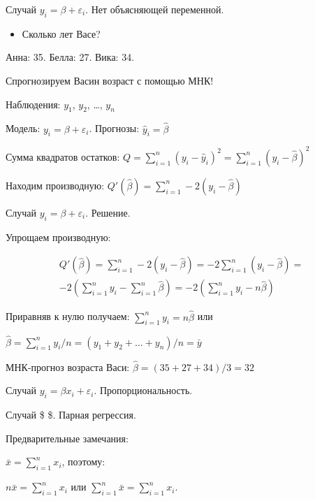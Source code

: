 \documentclass[ignorenonframetext,]{beamer}
\begin{document}
\begin{frame}{Случай $y_i=\beta+\varepsilon_i$. Нет объясняющей
переменной.}

\begin{itemize}
\itemsep1pt\parskip0pt
\item
  Сколько лет Васе?
\end{itemize}

Анна: 35. Белла: 27. Вика: 34.

Спрогнозируем Васин возраст с помощью МНК!

Наблюдения: $y_1$, $y_2$, \ldots{}, $y_n$

Модель: $y_i=\beta+\varepsilon_i$. Прогнозы: $\hat{y}_i=\hat{\beta}$

Сумма квадратов остатков:
$Q=\sum_{i=1}^n (y_i-\hat{y}_i)^2= \sum_{i=1}^n(y_i-\hat{\beta})^2$

Находим производную: $Q'(\hat{\beta})=\sum_{i=1}^n -2(y_i-\hat{\beta})$

\end{frame}

\begin{frame}{Случай $y_i=\beta+\varepsilon_i$. Решение.}

Упрощаем производную:

\begin{multline}
Q'(\hat{\beta})=\sum_{i=1}^n -2(y_i-\hat{\beta})=-2 \sum_{i=1}^n (y_i-\hat{\beta})=\\
-2 (\sum_{i=1}^n y_i-\sum_{i=1}^n \hat{\beta})=-2(\sum_{i=1}^n y_i-n\hat{\beta})
\end{multline}

Приравняв к нулю получаем: $\sum_{i=1}^n y_i=n\hat{\beta}$ или

$\hat{\beta}=\sum_{i=1}^n y_i /n=(y_1+y_2+...+y_n)/n=\bar{y}$

МНК-прогноз возраста Васи: $\hat{\beta}=(35+27+34)/3=32$

\end{frame}

\begin{frame}{Случай $y_i=\beta x_i+\varepsilon_i$. Пропорциональность.}

\end{frame}

\begin{frame}{Случай \$ \$. Парная регрессия.}

Предварительные замечания:

$\bar{x}=\sum_{i=1}^n x_i$, поэтому:

$n\bar{x}=\sum_{i=1}^n x_i$ или $\sum_{i=1}^n \bar{x}=\sum_{i=1}^n x_i$.

\end{frame}
\end{document}
